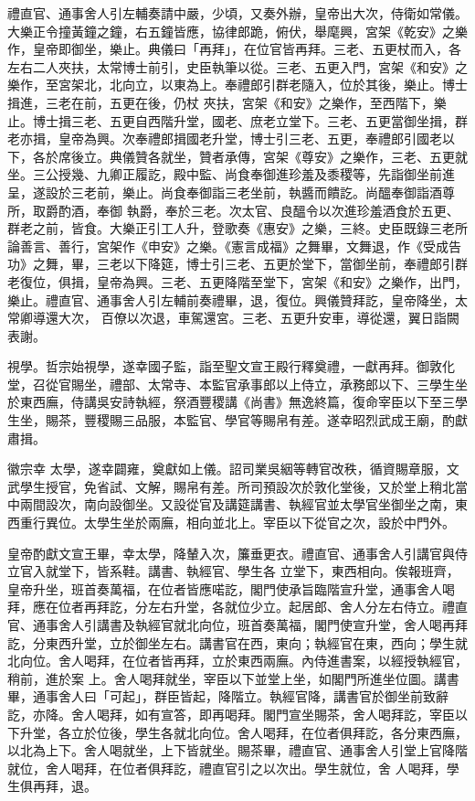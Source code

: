 \begin{pinyinscope}
 禮直官、通事舍人引左輔奏請中嚴，少頃，又奏外辦，皇帝出大次，侍衛如常儀。大樂正令撞黃鐘之鐘，右五鐘皆應，協律郎跪，俯伏，舉麾興，宮架《乾安》之樂作，皇帝即御坐，樂止。典儀曰「再拜」，在位官皆再拜。三老、五更杖而入，各左右二人夾扶，太常博士前引，史臣執筆以從。三老、五更入門，宮架《和安》之樂作，至宮架北，北向立，以東為上。奉禮郎引群老隨入，位於其後，樂止。博士揖進，三老在前，五更在後，仍杖
 夾扶，宮架《和安》之樂作，至西階下，樂止。博士揖三老、五更自西階升堂，國老、庶老立堂下。三老、五更當御坐揖，群老亦揖，皇帝為興。次奉禮郎揖國老升堂，博士引三老、五更，奉禮郎引國老以下，各於席後立。典儀贊各就坐，贊者承傳，宮架《尊安》之樂作，三老、五更就坐。三公授幾、九卿正履訖，殿中監、尚食奉御進珍羞及黍稷等，先詣御坐前進呈，遂設於三老前，樂止。尚食奉御詣三老坐前，執醬而饋訖。尚醞奉御詣酒尊所，取爵酌酒，奉御
 執爵，奉於三老。次太官、良醞令以次進珍羞酒食於五更、群老之前，皆食。大樂正引工人升，登歌奏《惠安》之樂，三終。史臣既錄三老所論善言、善行，宮架作《申安》之樂。《憲言成福》之舞畢，文舞退，作《受成告功》之舞，畢，三老以下降筵，博士引三老、五更於堂下，當御坐前，奉禮郎引群老復位，俱揖，皇帝為興。三老、五更降階至堂下，宮架《和安》之樂作，出門，樂止。禮直官、通事舍人引左輔前奏禮畢，退，復位。興儀贊拜訖，皇帝降坐，太常卿導還大次，
 百僚以次退，車駕還宮。三老、五更升安車，導從還，翼日詣闕表謝。



 視學。哲宗始視學，遂幸國子監，詣至聖文宣王殿行釋奠禮，一獻再拜。御敦化堂，召從官賜坐，禮部、太常寺、本監官承事郎以上侍立，承務郎以下、三學生坐於東西廡，侍講吳安詩執經，祭酒豐稷講《尚書》無逸終篇，復命宰臣以下至三學生坐，賜茶，豐稷賜三品服，本監官、學官等賜帛有差。遂幸昭烈武成王廟，酌獻肅揖。



 徽宗幸
 太學，遂幸闢雍，奠獻如上儀。詔司業吳絪等轉官改秩，循資賜章服，文武學生授官，免省試、文解，賜帛有差。所司預設次於敦化堂後，又於堂上稍北當中兩間設次，南向設御坐。又設從官及講筵講書、執經官並太學官坐御坐之南，東西重行異位。太學生坐於兩廡，相向並北上。宰臣以下從官之次，設於中門外。



 皇帝酌獻文宣王畢，幸太學，降輦入次，簾垂更衣。禮直官、通事舍人引講官與侍立官入就堂下，皆系鞋。講書、執經官、學生各
 立堂下，東西相向。俟報班齊，皇帝升坐，班首奏萬福，在位者皆應喏訖，閣門使承旨臨階宣升堂，通事舍人喝拜，應在位者再拜訖，分左右升堂，各就位少立。起居郎、舍人分左右侍立。禮直官、通事舍人引講書及執經官就北向位，班首奏萬福，閣門使宣升堂，舍人喝再拜訖，分東西升堂，立於御坐左右。講書官在西，東向；執經官在東，西向；學生就北向位。舍人喝拜，在位者皆再拜，立於東西兩廡。內侍進書案，以經授執經官，稍前，進於案
 上。舍人喝拜就坐，宰臣以下並堂上坐，如閣門所進坐位圖。講書畢，通事舍人曰「可起」，群臣皆起，降階立。執經官降，講書官於御坐前致辭訖，亦降。舍人喝拜，如有宣答，即再喝拜。閣門宣坐賜茶，舍人喝拜訖，宰臣以下升堂，各立於位後，學生各就北向位。舍人喝拜，在位者俱拜訖，各分東西廡，以北為上下。舍人喝就坐，上下皆就坐。賜茶畢，禮直官、通事舍人引堂上官降階就位，舍人喝拜，在位者俱拜訖，禮直官引之以次出。學生就位，舍
 人喝拜，學生俱再拜，退。




\end{pinyinscope}
